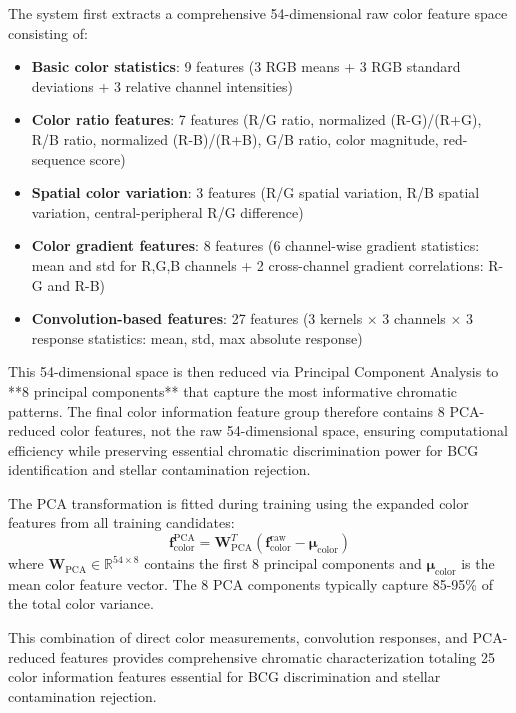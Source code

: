 \documentclass[twocolumn,10pt]{aastex631}
\begin{document}
The system first extracts a comprehensive 54-dimensional raw color feature space consisting of:
\begin{itemize}
\item \textbf{Basic color statistics}: 9 features (3 RGB means + 3 RGB standard deviations + 3 relative channel intensities)
\item \textbf{Color ratio features}: 7 features (R/G ratio, normalized (R-G)/(R+G), R/B ratio, normalized (R-B)/(R+B), G/B ratio, color magnitude, red-sequence score)
\item \textbf{Spatial color variation}: 3 features (R/G spatial variation, R/B spatial variation, central-peripheral R/G difference)
\item \textbf{Color gradient features}: 8 features (6 channel-wise gradient statistics: mean and std for R,G,B channels + 2 cross-channel gradient correlations: R-G and R-B)
\item \textbf{Convolution-based features}: 27 features (3 kernels × 3 channels × 3 response statistics: mean, std, max absolute response)
\end{itemize}

This 54-dimensional space is then reduced via Principal Component Analysis to **8 principal components** that capture the most informative chromatic patterns. The final color information feature group therefore contains 8 PCA-reduced color features, not the raw 54-dimensional space, ensuring computational efficiency while preserving essential chromatic discrimination power for BCG identification and stellar contamination rejection.

The PCA transformation is fitted during training using the expanded color features from all training candidates:
\begin{equation}
\mathbf{f}_{\text{color}}^{\text{PCA}} = \mathbf{W}_{\text{PCA}}^T (\mathbf{f}_{\text{color}}^{\text{raw}} - \boldsymbol{\mu}_{\text{color}})
\end{equation}
where $\mathbf{W}_{\text{PCA}} \in \mathbb{R}^{54 \times 8}$ contains the first 8 principal components and $\boldsymbol{\mu}_{\text{color}}$ is the mean color feature vector. The 8 PCA components typically capture 85-95\% of the total color variance.

This combination of direct color measurements, convolution responses, and PCA-reduced features provides comprehensive chromatic characterization totaling 25 color information features essential for BCG discrimination and stellar contamination rejection.
\end{document}
